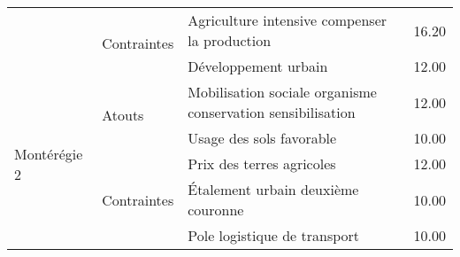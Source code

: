 \begin{table}[]
\begin{tabular}{m{}lm{}l}
                              & \multirow{2}{*}{Contraintes} & Agriculture intensive compenser la production                                  & 16.20 \\ \cline{3-4} 
                        &                              & Développement urbain                                         & 12.00          \\ \hline
\multirow{5}{*}{Montérégie 2} & \multirow{2}{*}{Atouts}      & Mobilisation sociale organisme conservation sensibilisation                    & 12.00 \\ \cline{3-4} 
                        &                              & Usage des sols favorable                                     & 10.00          \\ \cline{2-4} 
                        & \multirow{3}{*}{Contraintes} & Prix des terres agricoles                                    & 12.00          \\ \cline{3-4} 
                        &                              & Étalement urbain deuxième couronne                           & 10.00          \\ \cline{3-4} 
                        &                              & Pole logistique de transport                                 & 10.00          \\ \hline
\end{tabular}
\end{table}
